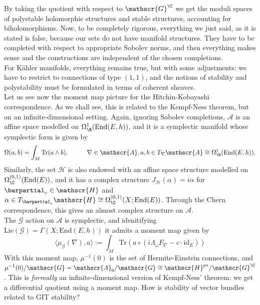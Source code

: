 By taking the quotient with respect to \(\mathscr{G}^\C\) we get the moduli spaces of polystable holomorphic structures and stable structures, accounting for biholomorphisms. Now, to be completely rigorous, everything we just said, as it is stated is false, because our sets do not have manifold structures. They have to be completed with respect to appropriate Sobolev norms, and then everything makes sense {\color{red} and the constructions are independent of the chosen completions}. \\

For Kähler manifolds, everything remains true, but with some adjustments: we have to restrict to connections of type \((1,1)\), and the notions of stability and polystability must be formulated in terms of coherent sheaves.\\

Let us see now the moment map picture for the Hitchin-Kobayashi correspondence. As we shall see, this is related to the Kempf-Ness theorem, but on an infinite-dimensional setting. Again, ignoring Sobolev completions, \(\mathscr{A}\) is an affine space modelled on \(\Omega_\R^1(\mathrm{End}(E,h))\), and it is a symplectic manifold whose symplectic form is given by
\[
\Omega(a,b)=\int_M \mathrm{Tr}(a \wedge b), \hspace{1 cm} \nabla \in \mathscr{A}, a,b \in T_\nabla \mathscr{A} \cong \Omega^1_\R(\mathrm{End}(E,h)).
\]
Similarly, the set \(\mathscr{H}\) is also endowed with an affine space structure modelled on \(\Omega_\C^{(0,1)}(\mathrm{End}(E))\), and it has a complex structure \(J_\mathscr{H}(\alpha)=i\alpha\) for \(\barpartial_e \in \mathscr{H}\) and \(\alpha\in T_{\barpartial_e} \mathscr{H} \cong \Omega_\C^{(0,1)}(X; \mathrm{End}(E))\). Through the Chern correspondence, this gives an almost complex structure on \(\mathscr{A}\).\\

The \(\mathscr{G}\) action on \(\mathscr{A}\) is symplectic, and idenitifying \(\mathrm{Lie}(\mathscr{G})=\Gamma(X; \mathrm{End}(E,h))\) it admits a moment map given by 
\[
\langle \mu_\mathscr{G}(\nabla), a\rangle:=\int_M \mathrm{Tr}(a \circ (i\Lambda_\omega F_\nabla-c \cdot \mathrm{id}_E))
\]
With this moment map, \(\mu^{-1}(0)\) is the set of Hermite-Einstein connections, and \(\mu^{-1}(0)/\mathscr{G}=\mathscr{A}_0/\mathscr{G}\cong \mathscr{H}^{ps}/\mathscr{G}^\C\). This is \textit{formally} an infinite-dimensional version of Kempf-Ness' theorem: we get a differential quotient using a moment map. {\color{red} How is stability of vector bundles related to GIT stability?}


